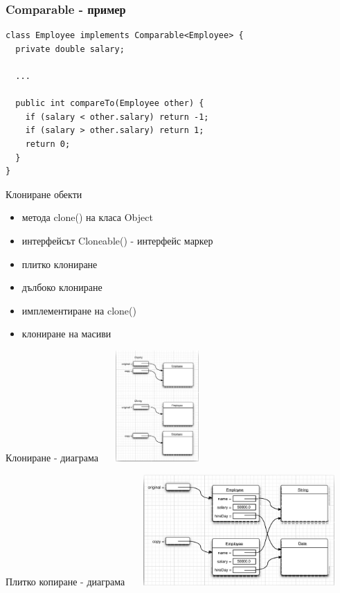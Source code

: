 \documentclass{beamer}
\begin{document}
\begin{frame}[fragile]
  \frametitle{Comparable - пример}
  \transdissolve
\begin{lstlisting}
class Employee implements Comparable<Employee> {
  private double salary;

  ...  

  public int compareTo(Employee other) {
    if (salary < other.salary) return -1;
    if (salary > other.salary) return 1;
    return 0;
  }
}  
\end{lstlisting}
\end{frame}

\begin{frame}{Клониране обекти}
  \transdissolve
  \begin{itemize}
  \item метода clone() на класа Object
  \item интерфейсът Cloneable() - интерфейс маркер
  \item плитко клониране
  \item дълбоко клониране
  \item имплементиране на clone()
  \item клониране на масиви
  \end{itemize}
\end{frame}

\begin{frame}{Клониране - диаграма}
  \transdissolve
  \includegraphics[width=160px,height=160px]{images/cloning.png}
\end{frame}

\begin{frame}{Плитко копиране - диаграма}
  \transdissolve
  \includegraphics[width=320px,height=160px]{images/shallow-copy.png}
\end{frame}
\end{document}
